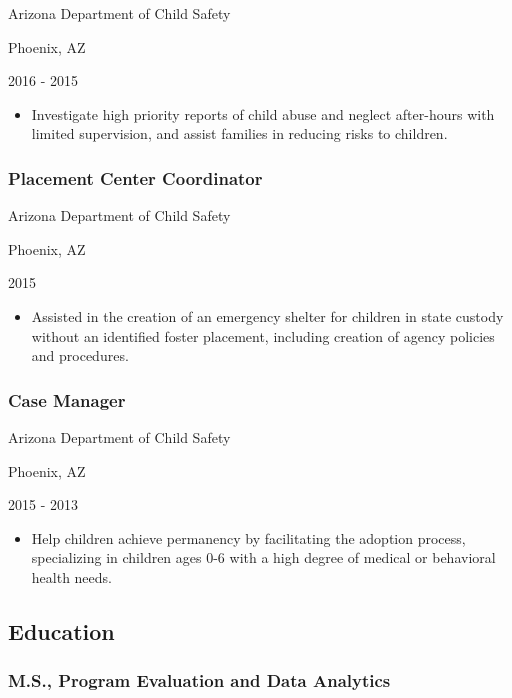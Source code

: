 \documentclass[
]{article}
\providecommand{\tightlist}{%
  \setlength{\itemsep}{0pt}\setlength{\parskip}{0pt}}
\begin{document}
Arizona Department of Child Safety

Phoenix, AZ

2016 - 2015

\begin{itemize}
\tightlist
\item
  Investigate high priority reports of child abuse and neglect
  after-hours with limited supervision, and assist families in reducing
  risks to children.
\end{itemize}

\hypertarget{placement-center-coordinator}{%
\subsubsection{Placement Center
Coordinator}\label{placement-center-coordinator}}

Arizona Department of Child Safety

Phoenix, AZ

2015

\begin{itemize}
\tightlist
\item
  Assisted in the creation of an emergency shelter for children in state
  custody without an identified foster placement, including creation of
  agency policies and procedures.
\end{itemize}

\hypertarget{case-manager}{%
\subsubsection{Case Manager}\label{case-manager}}

Arizona Department of Child Safety

Phoenix, AZ

2015 - 2013

\begin{itemize}
\tightlist
\item
  Help children achieve permanency by facilitating the adoption process,
  specializing in children ages 0-6 with a high degree of medical or
  behavioral health needs.
\end{itemize}

\hypertarget{education}{%
\subsection{Education}\label{education}}

\hypertarget{m.s.-program-evaluation-and-data-analytics}{%
\subsubsection{M.S., Program Evaluation and Data
Analytics}\label{m.s.-program-evaluation-and-data-analytics}}
\end{document}
